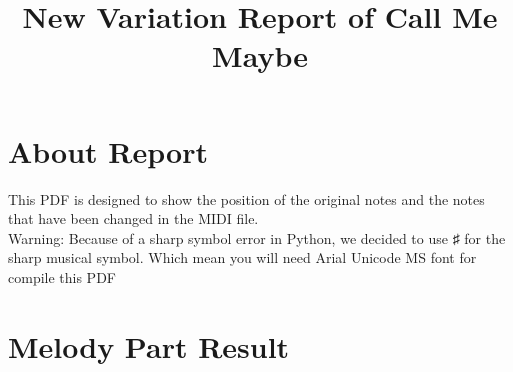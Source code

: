 \documentclass{article}
\title{New Variation Report of Call Me Maybe}
\begin{document}
\maketitle
\section*{About Report}
This PDF is designed to show the position of the original notes and the notes that have been changed in the MIDI file. \\
Warning: Because of a sharp symbol error in Python, we decided to use ♯ for the sharp musical symbol. Which mean you will need Arial Unicode MS font for compile this PDF
\section*{Melody Part Result}
\end{document}
